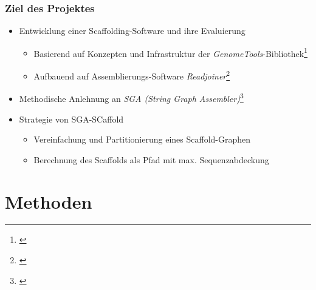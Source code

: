 \documentclass[xcolor=pst]{beamer}
\begin{document}
\begin{frame}
  \frametitle{Ziel des Projektes}
  \begin{itemize}
  \item Entwicklung einer Scaffolding-Software und ihre Evaluierung
  \begin{itemize}
    \item Basierend auf Konzepten und Infrastruktur der \textit{GenomeTools}-Bibliothek\footnote{\cite{Gremme:2013}}
    \item Aufbauend auf Assemblierungs-Software \textit{Readjoiner}\footnote{\cite{Gonnella:2012gn}}
  \end{itemize}
  \item Methodische Anlehnung an \textit{SGA (String Graph Assembler)}\footnote{\cite{Simpson:2012ef}}
  \item Strategie von SGA-SCaffold
  \begin{itemize}
    \item Vereinfachung und Partitionierung eines Scaffold-Graphen
    \item Berechnung des Scaffolds als Pfad mit max. Sequenzabdeckung
  \end{itemize}
  \end{itemize}
\end{frame}

\section{Methoden}
\end{document}
